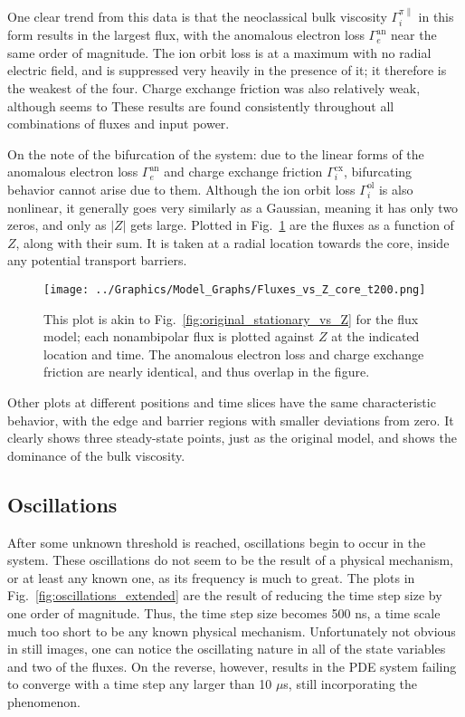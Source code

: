 One clear trend from this data is that the neoclassical bulk viscosity $\Gamma_i^{\pi\parallel}$ in this form results in the largest flux, with the anomalous electron loss $\Gamma_e^\text{an}$ near the same order of magnitude.
The ion orbit loss is at a maximum with no radial electric field, and is suppressed very heavily in the presence of it; it therefore is the weakest of the four.
Charge exchange friction was also relatively weak, although seems to 
These results are found consistently throughout all combinations of fluxes and input power.

On the note of the bifurcation of the system: due to the linear forms of the anomalous electron loss $\Gamma_e^\text{an}$ and charge exchange friction $\Gamma_i^\text{cx}$, bifurcating behavior cannot arise due to them.
Although the ion orbit loss $\Gamma_i^\text{ol}$ is also nonlinear, it generally goes very similarly as a Gaussian, meaning it has only two zeros, and only as $|Z|$ gets large.
Plotted in Fig.~\ref{fig:fluxes_steady-state} are the fluxes as a function of $Z$, along with their sum.
It is taken at a radial location towards the core, inside any potential transport barriers.

\begin{figure}[!htb] %
	\centering
	\texttt{[image: ../Graphics/Model\_Graphs/Fluxes\_vs\_Z\_core\_t200.png]}
	\caption{This plot is akin to Fig.~\ref{fig:original_stationary_vs_Z} for the flux model; each nonambipolar flux is plotted against $Z$ at the indicated location and time.
	The anomalous electron loss and charge exchange friction are nearly identical, and thus overlap in the figure.}
	\label{fig:fluxes_steady-state}
\end{figure}

Other plots at different positions and time slices have the same characteristic behavior, with the edge and barrier regions with smaller deviations from zero.
It clearly shows three steady-state points, just as the original model, and shows the dominance of the bulk viscosity.

\subsection{Oscillations} \label{ssec:oscillations}
After some unknown threshold is reached, oscillations begin to occur in the system.
These oscillations do not seem to be the result of a physical mechanism, or at least any known one, as its frequency is much to great.
The plots in Fig.~\ref{fig:oscillations_extended} are the result of reducing the time step size by one order of magnitude.
Thus, the time step size becomes 500 ns, a time scale much too short to be any known physical mechanism.
Unfortunately not obvious in still images, one can notice the oscillating nature in all of the state variables and two of the fluxes.
On the reverse, however, results in the PDE system failing to converge with a time step any larger than 10 $\mu$s, still incorporating the phenomenon.

